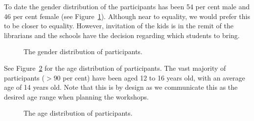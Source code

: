 \documentclass[12pt]{report} %
\begin{document}
To date the gender distribution of the participants has been 54 per cent male and 46 per cent female (see Figure~\ref{fig:ACgender}). Although near to equality, we would prefer this to be closer to equality. However, invitation of the kids is in the remit of the librarians and the schools have the decision regarding which students to bring.   

\begin{figure}[!htb] %
\caption{The gender distribution of participants.}
\label{fig:ACgender}
\end{figure}


See Figure~\ref{fig:ACage} for the age distribution of participants. The vast majority of participants ($>90$ per cent) have been aged 12 to 16 years old, with an average age of 14 years old. Note that this is by design as we communicate this as the desired age range when planning the workshops.  

\begin{figure}[!htb] %
\caption{The age distribution of participants.}
\label{fig:ACage}
\end{figure}

\end{document}
